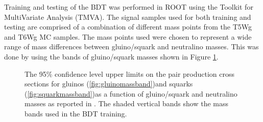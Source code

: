 Training and testing of the BDT was performed in ROOT using the Toolkit for MultiVariate Analysis (TMVA).  The signal samples used for both training and testing are comprised of a combination of different mass points from the T5Wg and T6Wg MC samples.  The mass points used were chosen to represent a wide range of mass differences between gluino/squark and neutralino masses.  This was done by using the bands of gluino/squark masses shown in Figure \ref{fig:massbands}.   
\begin{figure}[h]
	\centering
	\qquad
	\caption{The 95\% confidence level upper limits on the pair production cross sections for gluinos (\ref{fig:gluinomassband})and squarks (\ref{fig:squarkmassband})as a function of gluino/squark and neutralino masses as reported in \cite{CMS:OldSUSYpaper}.  The shaded vertical bands show the mass bands used in the BDT training.}
	\label{fig:massbands}
\end{figure}
